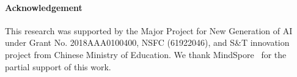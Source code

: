 \documentclass[final]{cvpr}
\begin{document}
\vspace{-8pt}
\paragraph{Acknowledgement}

This research was supported by the Major Project for New Generation of AI 
under Grant No. 2018AAA0100400, NSFC (61922046), 
and S\&T innovation project from Chinese Ministry of Education.
We thank MindSpore~\cite{mindspore2020} for the partial support of this work.

\clearpage
{
\small


}
\end{document}
